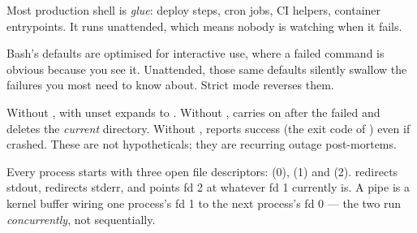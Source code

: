 
 Most production shell is \emph{glue}: deploy steps, cron jobs, CI helpers, container entrypoints. It runs unattended, which means nobody is watching when it fails.

 Bash's defaults are optimised for interactive use, where a failed command is obvious because you see it. Unattended, those same defaults silently swallow the failures you most need to know about. Strict mode reverses them.


\begin{secwarn}
Without ,  with  unset expands to . Without ,  carries on after the failed  and deletes the \emph{current} directory. Without ,  reports success (the exit code of ) even if  crashed. These are not hypotheticals; they are recurring outage post-mortems.
\end{secwarn}


 Every process starts with three open file descriptors:  (0),  (1) and  (2). \code{>} redirects stdout,  redirects stderr, and  points fd 2 at whatever fd 1 currently is. A pipe \code{|} is a kernel buffer wiring one process's fd 1 to the next process's fd 0 --- the two run \emph{concurrently}, not sequentially.


